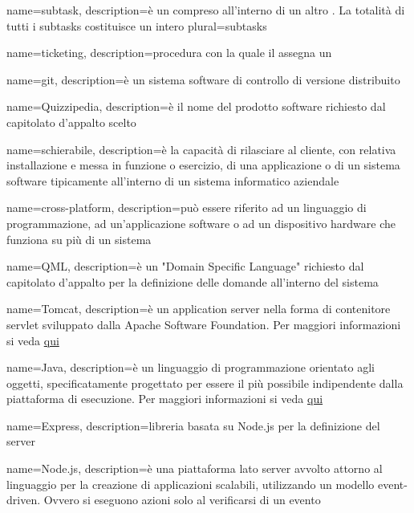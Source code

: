  {
	name=subtask,
	description={è un  compreso all'interno di un altro . La totalità di tutti i subtasks costituisce un intero }
	plural=subtasks
}

 {
	name=ticketing,
	description={procedura con la quale il \RE assegna un }
}

 {
	name=git,
	description={è un sistema software di controllo di versione distribuito}
}

 {
	name=Quizzipedia,
	description={è il nome del prodotto software richiesto dal capitolato d'appalto scelto}
}

 {
	name=schierabile,
	description={è la capacità di rilasciare al cliente, con relativa installazione e messa in funzione o esercizio, di una applicazione o di un sistema software tipicamente all'interno di un sistema informatico aziendale}
}

 {
	name=cross-platform,
	description={può essere riferito ad un linguaggio di programmazione, ad un'applicazione software o ad un dispositivo hardware che funziona su più di un sistema}
}

 {
	name=QML,
	description={è un "Domain Specific Language" richiesto dal capitolato d'appalto per la definizione delle domande all'interno del sistema}
}

 {
	name=Tomcat,
	description={è un application server nella forma di contenitore servlet  sviluppato dalla Apache Software Foundation. Per maggiori informazioni si veda \href{https://it.wikipedia.org/wiki/Apache_Tomcat}{qui}}
}

 {
	name=Java,
	description={è un linguaggio di programmazione orientato agli oggetti, specificatamente progettato per essere il più possibile indipendente dalla piattaforma di esecuzione. Per maggiori informazioni si veda \href{https://it.wikipedia.org/wiki/Java_(linguaggio_di_programmazione)}{qui}}
}

 {
	name=Express,
	description={libreria basata su Node.js per la definizione del server}
}

 {
	name=Node.js,
	description={è una piattaforma lato server avvolto attorno al linguaggio  per la creazione di applicazioni scalabili, utilizzando un modello event-driven. Ovvero si eseguono azioni solo al verificarsi di un evento }
}

